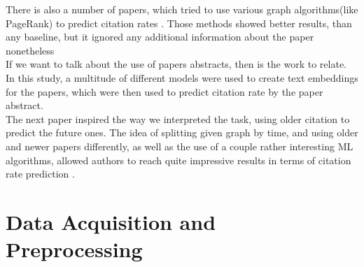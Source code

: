 \documentclass{article}
\newcommand\tab[1][1cm]{\hspace*{#1}}
\begin{document}
\tab There is also a number of papers, which tried to use various graph algorithms(like PageRank) to predict citation rates \cite{3}. Those methods showed better results, than any baseline, but it ignored any additional information about the paper nonetheless\\

\tab If we want to talk about the use of papers abstracts, then\cite{4} is the work to relate. In this study, a multitude of different models were used to create text embeddings for the papers, which were then used to predict citation rate by the paper abstract.\\

\tab The next paper inspired the way we interpreted the task, using older citation to predict the future ones\cite{5}. The idea of splitting given graph by time, and using older and newer papers differently, as well as the use of a couple rather interesting ML algorithms, allowed authors to reach quite impressive results in terms of citation rate prediction .\\
\section{Data Acquisition and Preprocessing}
\end{document}
